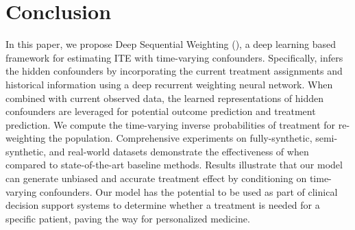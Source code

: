 \section{Conclusion}
In this paper, we propose Deep Sequential Weighting (\modelnospace), a deep learning based framework for estimating ITE with time-varying confounders. Specifically, \model infers the hidden confounders by incorporating the current treatment assignments and historical information using a deep recurrent weighting neural network. When combined with current observed data, the learned representations of hidden confounders are leveraged for potential outcome prediction and treatment prediction. We compute the time-varying inverse probabilities of treatment for re-weighting the population. Comprehensive experiments on fully-synthetic, semi-synthetic, and real-world datasets demonstrate the effectiveness of \model when compared to state-of-the-art baseline methods. Results illustrate that our model can generate unbiased and accurate treatment effect by conditioning on time-varying confounders. Our model has the potential to be used as part of clinical decision support systems to determine whether a treatment is needed for a specific patient, paving the way for personalized medicine.



